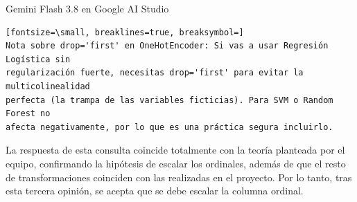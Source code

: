 \documentclass[12pt,a4paper,oneside]{book}
\begin{document}
\begin{iaresp}{Gemini Flash 3.8 en Google AI Studio}
\begin{Verbatim}[fontsize=\small, breaklines=true, breaksymbol=]
Nota sobre drop='first' en OneHotEncoder: Si vas a usar Regresión Logística sin
regularización fuerte, necesitas drop='first' para evitar la multicolinealidad
perfecta (la trampa de las variables ficticias). Para SVM o Random Forest no
afecta negativamente, por lo que es una práctica segura incluirlo.
\end{Verbatim}
\end{iaresp}
\begin{iaanalisis}
La respuesta de esta consulta coincide totalmente con la teoría planteada por el equipo, confirmando la hipótesis de escalar los ordinales, además de que el resto de transformaciones coinciden con las realizadas en el proyecto. Por lo tanto, tras esta tercera opinión, se acepta que se debe escalar la columna ordinal.
\end{iaanalisis}
\end{document}
